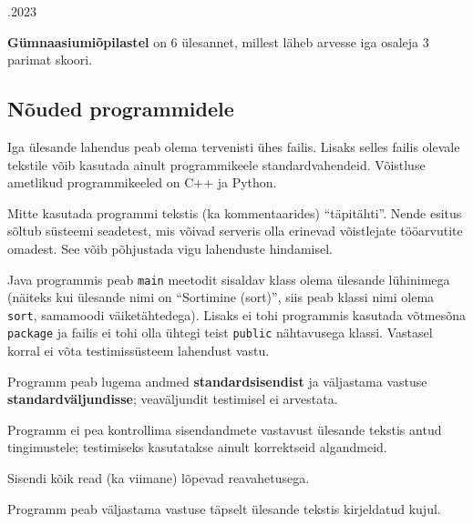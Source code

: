 \documentclass[a4paper,10pt]{article}
\begin{document}
\begin{ol}{\eio}{.2023}{\juh}{}
\begin{xitem}
\item \textbf{Gümnaasiumiõpilastel} on 6 ülesannet, millest läheb arvesse iga osaleja 3 parimat skoori.

\end{xitem}

\subsection*{Nõuded programmidele}

\begin{xitem}

\item Iga ülesande lahendus peab olema tervenisti ühes failis. Lisaks selles failis olevale tekstile võib kasutada ainult programmikeele standardvahendeid. Võistluse ametlikud programmikeeled on C++ ja Python.

  \begin{xitem}

  \item Mitte kasutada programmi tekstis (ka kommentaarides) ``täpitähti''. Nende esitus sõltub süsteemi seadetest, mis võivad serveris olla erinevad võistlejate tööarvutite omadest. See võib põhjustada vigu lahenduste hindamisel.

  \item Java programmis peab \verb'main' meetodit sisaldav klass olema ülesande lühinimega (näiteks kui ülesande nimi on ``Sortimine (sort)'', siis peab klassi nimi olema \verb'sort', samamoodi väiketähtedega). Lisaks ei tohi programmis kasutada võtmesõna \verb'package' ja failis ei tohi olla ühtegi teist \verb'public' nähtavusega klassi. Vastasel korral ei võta testimissüsteem lahendust vastu.

  \end{xitem}

\item Programm peab lugema andmed \textbf{standardsisendist} ja väljastama vastuse \textbf{standardväljundisse}; veaväljundit testimisel ei arvestata.

  \begin{xitem}

  \item Programm ei pea kontrollima sisendandmete vastavust ülesande tekstis antud tingimustele; testimiseks kasutatakse ainult korrektseid algandmeid.

  \item Sisendi kõik read (ka viimane) lõpevad reavahetusega.

  \item Programm peab väljastama vastuse täpselt ülesande tekstis kirjeldatud kujul.


\end{xitem}
\end{xitem}
\end{ol}
\end{document}
